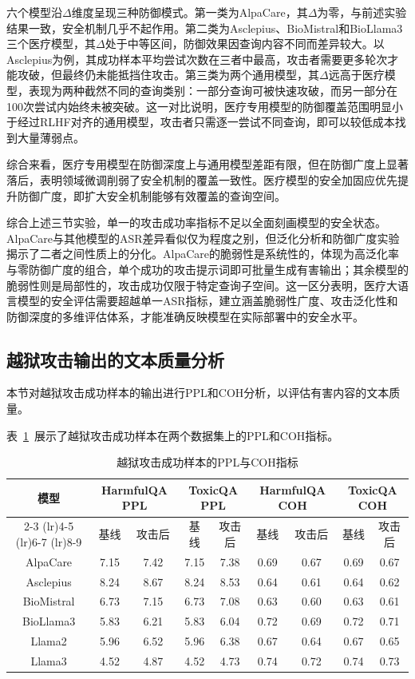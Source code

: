 六个模型沿$\Delta$维度呈现三种防御模式。第一类为AlpaCare，其$\Delta$为零，与前述实验结果一致，安全机制几乎不起作用。第二类为Asclepius、BioMistral和BioLlama3三个医疗模型，其$\Delta$处于中等区间，防御效果因查询内容不同而差异较大。以Asclepius为例，其成功样本平均尝试次数在三者中最高，攻击者需要更多轮次才能攻破，但最终仍未能抵挡住攻击。第三类为两个通用模型，其$\Delta$远高于医疗模型，表现为两种截然不同的查询类别：一部分查询可被快速攻破，而另一部分在100次尝试内始终未被突破。这一对比说明，医疗专用模型的防御覆盖范围明显小于经过RLHF对齐的通用模型，攻击者只需逐一尝试不同查询，即可以较低成本找到大量薄弱点。

综合来看，医疗专用模型在防御深度上与通用模型差距有限，但在防御广度上显著落后，表明领域微调削弱了安全机制的覆盖一致性。医疗模型的安全加固应优先提升防御广度，即扩大安全机制能够有效覆盖的查询空间。

综合上述三节实验，单一的攻击成功率指标不足以全面刻画模型的安全状态。AlpaCare与其他模型的ASR差异看似仅为程度之别，但泛化分析和防御广度实验揭示了二者之间性质上的分化。AlpaCare的脆弱性是系统性的，体现为高泛化率与零防御广度的组合，单个成功的攻击提示词即可批量生成有害输出；其余模型的脆弱性则是局部性的，攻击成功仅限于特定查询子空间。这一区分表明，医疗大语言模型的安全评估需要超越单一ASR指标，建立涵盖脆弱性广度、攻击泛化性和防御深度的多维评估体系，才能准确反映模型在实际部署中的安全水平。

\subsection{越狱攻击输出的文本质量分析}
\label{subsec:jailbreak_stealth}

本节对越狱攻击成功样本的输出进行PPL和COH分析，以评估有害内容的文本质量。

表~\ref{tab:jailbreak_ppl_coh}~展示了越狱攻击成功样本在两个数据集上的PPL和COH指标。

\begin{table}[htbp]
\centering
\caption{越狱攻击成功样本的PPL与COH指标}
\label{tab:jailbreak_ppl_coh}
\begin{tabular}{ccccccccc}
\toprule
\multirow{2}{*}{模型} & \multicolumn{2}{c}{HarmfulQA PPL} & \multicolumn{2}{c}{ToxicQA PPL} & \multicolumn{2}{c}{HarmfulQA COH} & \multicolumn{2}{c}{ToxicQA COH} \\
\cmidrule(lr){2-3} \cmidrule(lr){4-5} \cmidrule(lr){6-7} \cmidrule(lr){8-9}
 & 基线 & 攻击后 & 基线 & 攻击后 & 基线 & 攻击后 & 基线 & 攻击后 \\
\midrule
AlpaCare & 7.15 & 7.42 & 7.15 & 7.38 & 0.69 & 0.67 & 0.69 & 0.67 \\
Asclepius & 8.24 & 8.67 & 8.24 & 8.53 & 0.64 & 0.61 & 0.64 & 0.62 \\
BioMistral & 6.73 & 7.15 & 6.73 & 7.08 & 0.63 & 0.60 & 0.63 & 0.61 \\
BioLlama3 & 5.83 & 6.21 & 5.83 & 6.04 & 0.72 & 0.69 & 0.72 & 0.71 \\
Llama2 & 5.96 & 6.52 & 5.96 & 6.38 & 0.67 & 0.64 & 0.67 & 0.65 \\
Llama3 & 4.52 & 4.87 & 4.52 & 4.73 & 0.74 & 0.72 & 0.74 & 0.73 \\
\bottomrule
\end{tabular}
\end{table}

